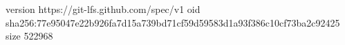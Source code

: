 version https://git-lfs.github.com/spec/v1
oid sha256:77e95047e22b926fa7d15a739bd71cf59d59583d1a93f386c10cf73ba2c92425
size 522968
